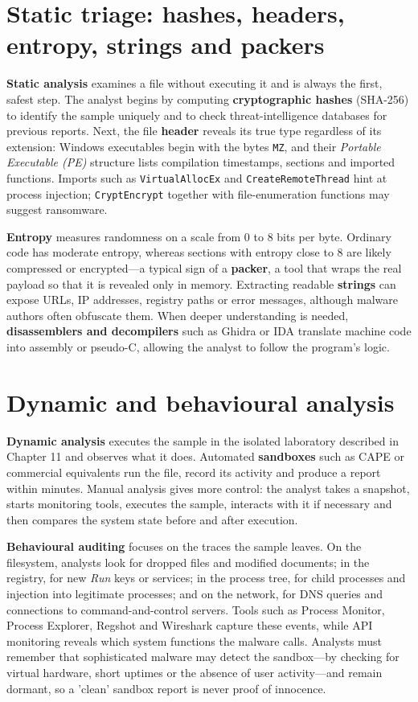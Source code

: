 \section{Static triage: hashes, headers, entropy, strings and packers}\label{sec:12.1}
\textbf{Static analysis} examines a file without executing it and is always the first, safest step. The analyst begins by computing \textbf{cryptographic hashes} (SHA-256) to identify the sample uniquely and to check threat-intelligence databases for previous reports. Next, the file \textbf{header} reveals its true type regardless of its extension: Windows executables begin with the bytes \texttt{MZ}, and their \emph{Portable Executable (PE)} structure lists compilation timestamps, sections and imported functions. Imports such as \texttt{VirtualAllocEx} and \texttt{CreateRemoteThread} hint at process injection; \texttt{CryptEncrypt} together with file-enumeration functions may suggest ransomware.

\textbf{Entropy} measures randomness on a scale from 0 to 8 bits per byte. Ordinary code has moderate entropy, whereas sections with entropy close to 8 are likely compressed or encrypted—a typical sign of a \textbf{packer}, a tool that wraps the real payload so that it is revealed only in memory. Extracting readable \textbf{strings} can expose URLs, IP addresses, registry paths or error messages, although malware authors often obfuscate them. When deeper understanding is needed, \textbf{disassemblers and decompilers} such as Ghidra or IDA translate machine code into assembly or pseudo-C, allowing the analyst to follow the program's logic.

\section{Dynamic and behavioural analysis}\label{sec:12.2}
\textbf{Dynamic analysis} executes the sample in the isolated laboratory described in Chapter 11 and observes what it does. Automated \textbf{sandboxes} such as CAPE or commercial equivalents run the file, record its activity and produce a report within minutes. Manual analysis gives more control: the analyst takes a snapshot, starts monitoring tools, executes the sample, interacts with it if necessary and then compares the system state before and after execution.

\textbf{Behavioural auditing} focuses on the traces the sample leaves. On the filesystem, analysts look for dropped files and modified documents; in the registry, for new \emph{Run} keys or services; in the process tree, for child processes and injection into legitimate processes; and on the network, for DNS queries and connections to command-and-control servers. Tools such as Process Monitor, Process Explorer, Regshot and Wireshark capture these events, while API monitoring reveals which system functions the malware calls. Analysts must remember that sophisticated malware may detect the sandbox—by checking for virtual hardware, short uptimes or the absence of user activity—and remain dormant, so a 'clean' sandbox report is never proof of innocence.


